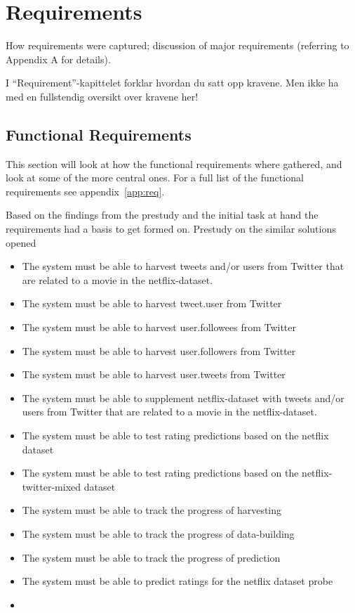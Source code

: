 
\chapter{Requirements}

\minitoc

How requirements  were  captured;
  discussion  of  major requirements
(referring  to  Appendix  A for details).

I “Requirement”-kapittelet forklar hvordan du satt opp kravene.
Men ikke ha med en fullstendig oversikt over kravene her!


\clearpage

\section{Functional Requirements}\label{section:functional-requirements}
This section will look at how the functional requirements where gathered, and look at some of the more central ones. For a full list of the functional requirements see appendix~\ref{app:req}.

Based on the findings from the prestudy and the initial task at hand the requirements had a basis to get formed on. Prestudy on the similar solutions opened

\begin{itemize}
  \item The system must be able to harvest tweets and/or users from Twitter that are related to a movie in the netflix-dataset.
  \item The system must be able to harvest tweet.user from Twitter
  \item The system must be able to harvest user.followees from Twitter
  \item The system must be able to harvest user.followers from Twitter
  \item The system must be able to harvest user.tweets from Twitter

  \item The system must be able to supplement netflix-dataset with tweets and/or users from Twitter that are related to a movie in the netflix-dataset.
  \item The system must be able to test rating predictions based on the netflix dataset
  \item The system must be able to test rating predictions based on the netflix-twitter-mixed dataset
  \item The system must be able to track the progress of harvesting
  \item The system must be able to track the progress of data-building
  \item The system must be able to track the progress of prediction
  \item The system must be able to predict ratings for the netflix dataset probe
  \item
\end{itemize}

